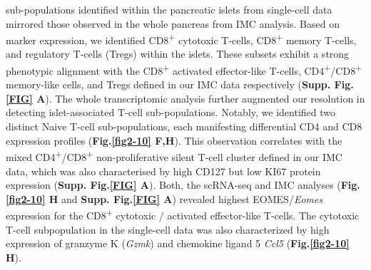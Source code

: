 sub-populations identified within the pancreatic islets from single-cell data mirrored those observed in the whole pancreas from IMC analysis. Based on marker expression, we identified CD8\textsuperscript{+} cytotoxic T-cells, CD8\textsuperscript{+} memory T-cells, and regulatory T-cells (Tregs) within the islets. These subsets exhibit a strong phenotypic alignment with the CD8\textsuperscript{+} activated effector-like T-cells, CD4\textsuperscript{+}/CD8\textsuperscript{+} memory-like cells, and Tregs defined in our IMC data respectively (\textbf{Supp. Fig.\ref{FIG} A}). The whole transcriptomic analysis further augmented our resolution in detecting islet-associated T-cell sub-populations. Notably, we identified two distinct Naive T-cell sub-populations, each manifesting differential CD4 and CD8 expression profiles (\textbf{Fig.\ref{fig2-10} F,H}). This  observation correlates with the mixed CD4\textsuperscript{+}/CD8\textsuperscript{+} non-proliferative silent T-cell cluster defined in our IMC data, which was also characterised by high CD127 but low KI67 protein expression (\textbf{Supp. Fig.\ref{FIG} A}). Both, the scRNA-seq and IMC analyses (\textbf{Fig.\ref{fig2-10} H} and \textbf{Supp. Fig.\ref{FIG} A}) revealed highest EOMES/\textit{Eomes} expression for the CD8\textsuperscript{+} cytotoxic / activated effector-like T-cells. The cytotoxic T-cell subpopulation in the single-cell data was also characterized by high expression of granzyme K (\textit{Gzmk}) and chemokine ligand 5 \textit{Ccl5} (\textbf{Fig.\ref{fig2-10} H}).








